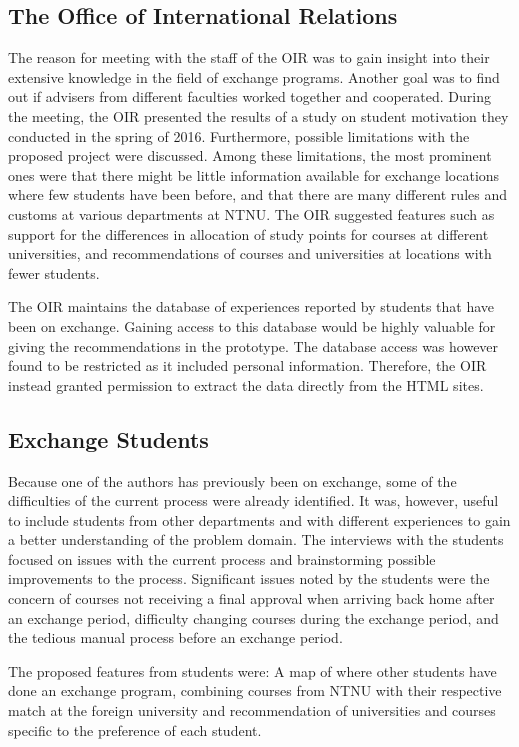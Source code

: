 \subsection{The Office of International Relations}

The reason for meeting with the staff of the OIR was to gain insight into their extensive knowledge in the field of exchange programs. Another goal was to find out if advisers from different faculties worked together and cooperated. During the meeting, the OIR presented the results of a study on student motivation they conducted in the spring of 2016. Furthermore, possible limitations with the proposed project were discussed. Among these limitations, the most prominent ones were that there might be little information available for exchange locations where few students have been before, and that there are many different rules and customs at various departments at NTNU. The OIR suggested features such as support for the differences in allocation of study points for courses at different universities, and recommendations of courses and universities at locations with fewer students.

The OIR maintains the database of experiences reported by students that have been on exchange. Gaining access to this database would be highly valuable for giving the recommendations in the prototype. The database access was however found to be restricted as it included personal information. Therefore, the OIR instead granted permission to extract the data directly from the HTML sites. 

\subsection{Exchange Students}

Because one of the authors has previously been on exchange, some of the difficulties of the current process were already identified. It was, however, useful to include students from other departments and with different experiences to gain a better understanding of the problem domain. The interviews with the students focused on issues with the current process and brainstorming possible improvements to the process. Significant issues noted by the students were the concern of courses not receiving a final approval when arriving back home after an exchange period, difficulty changing courses during the exchange period, and the tedious manual process before an exchange period.

The proposed features from students were: A map of where other students have done an exchange program, combining courses from NTNU with their respective match at the foreign university and recommendation of universities and courses specific to the preference of each student. 

